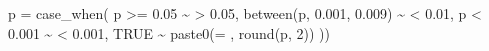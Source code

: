 \documentclass[
]{article}
\newenvironment{Shaded}{\begin{snugshade}}{\end{snugshade}}
\newcommand{\AttributeTok}[1]{\textcolor[rgb]{0.77,0.63,0.00}{#1}}
\newcommand{\ConstantTok}[1]{\textcolor[rgb]{0.00,0.00,0.00}{#1}}
\newcommand{\DecValTok}[1]{\textcolor[rgb]{0.00,0.00,0.81}{#1}}
\newcommand{\FloatTok}[1]{\textcolor[rgb]{0.00,0.00,0.81}{#1}}
\newcommand{\FunctionTok}[1]{\textcolor[rgb]{0.00,0.00,0.00}{#1}}
\newcommand{\NormalTok}[1]{#1}
\newcommand{\SpecialCharTok}[1]{\textcolor[rgb]{0.00,0.00,0.00}{#1}}
\newcommand{\StringTok}[1]{\textcolor[rgb]{0.31,0.60,0.02}{#1}}
\begin{document}
\begin{Shaded}
\begin{Highlighting}[]
             \AttributeTok{p =} \FunctionTok{case\_when}\NormalTok{(}
\NormalTok{                  p }\SpecialCharTok{\textgreater{}=} \FloatTok{0.05} \SpecialCharTok{\textasciitilde{}} \StringTok{\textquotesingle{}\textgreater{} 0.05\textquotesingle{}}\NormalTok{,}
                  \FunctionTok{between}\NormalTok{(p, }\FloatTok{0.001}\NormalTok{, }\FloatTok{0.009}\NormalTok{) }\SpecialCharTok{\textasciitilde{}} \StringTok{\textquotesingle{}\textless{} 0.01\textquotesingle{}}\NormalTok{, }
\NormalTok{                  p }\SpecialCharTok{\textless{}} \FloatTok{0.001} \SpecialCharTok{\textasciitilde{}} \StringTok{\textquotesingle{}\textless{} 0.001\textquotesingle{}}\NormalTok{,}
                  \ConstantTok{TRUE} \SpecialCharTok{\textasciitilde{}} \FunctionTok{paste0}\NormalTok{(}\StringTok{\textquotesingle{}= \textquotesingle{}}\NormalTok{, }\FunctionTok{round}\NormalTok{(p, }\DecValTok{2}\NormalTok{))   ))}
\end{Highlighting}
\end{Shaded}
\end{document}
